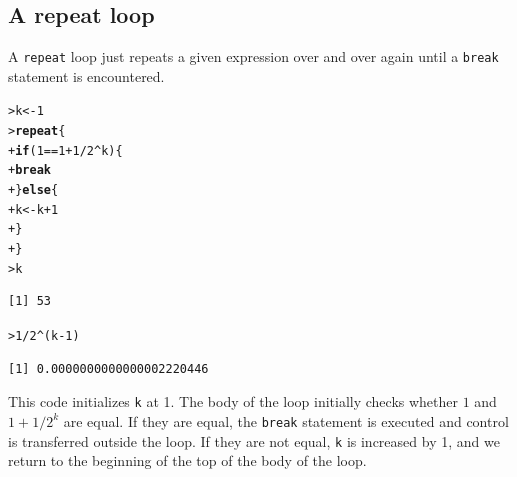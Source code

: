 \documentclass[12pt,oneside]{book}\usepackage[]{graphicx}\usepackage[]{color}
\makeatletter
\newcommand{\hlnum}[1]{\textcolor[rgb]{0.686,0.059,0.569}{#1}}%
\newcommand{\hlopt}[1]{\textcolor[rgb]{0,0,0}{#1}}%
\newcommand{\hlstd}[1]{\textcolor[rgb]{0.345,0.345,0.345}{#1}}%
\newcommand{\hlkwa}[1]{\textcolor[rgb]{0.161,0.373,0.58}{\textbf{#1}}}%
\newcommand{\hlkwb}[1]{\textcolor[rgb]{0.69,0.353,0.396}{#1}}%
\newenvironment{kframe}{%
 \def\at@end@of@kframe{}%
 \ifinner\ifhmode%
  \def\at@end@of@kframe{\end{minipage}}%
  \begin{minipage}{\columnwidth}%
 \fi\fi%
 \def\FrameCommand##1{\hskip\@totalleftmargin \hskip-\fboxsep
 \colorbox{shadecolor}{##1}\hskip-\fboxsep
     \hskip-\linewidth \hskip-\@totalleftmargin \hskip\columnwidth}%
 \MakeFramed {\advance\hsize-\width
   \@totalleftmargin\z@ \linewidth\hsize
   \@setminipage}}%
 {\par\unskip\endMakeFramed%
 \at@end@of@kframe}
\newenvironment{knitrout}{}{} %
\makeatother
\begin{document}
\subsection{A repeat loop}
A \verb+repeat+ loop just repeats a given expression over and over again until a \verb+break+ statement is encountered. 
\begin{knitrout}
\color{fgcolor}\begin{kframe}
\begin{alltt}
\hlstd{> }\hlstd{k} \hlkwb{<-} \hlnum{1}
\hlstd{> }\hlkwa{repeat} \hlstd{\{}
\hlstd{+ }    \hlkwa{if} \hlstd{(}\hlnum{1} \hlopt{==} \hlnum{1} \hlopt{+} \hlnum{1}\hlopt{/}\hlnum{2}\hlopt{^}\hlstd{k) \{}
\hlstd{+ }        \hlkwa{break}
\hlstd{+ }    \hlstd{\}} \hlkwa{else} \hlstd{\{}
\hlstd{+ }        \hlstd{k} \hlkwb{<-} \hlstd{k} \hlopt{+} \hlnum{1}
\hlstd{+ }    \hlstd{\}}
\hlstd{+ }\hlstd{\}}
\hlstd{> }\hlstd{k}
\end{alltt}
\begin{verbatim}
[1] 53
\end{verbatim}
\begin{alltt}
\hlstd{> }\hlnum{1}\hlopt{/}\hlnum{2}\hlopt{^}\hlstd{(k} \hlopt{-} \hlnum{1}\hlstd{)}
\end{alltt}
\begin{verbatim}
[1] 0.0000000000000002220446
\end{verbatim}
\end{kframe}
\end{knitrout}
This code initializes \verb+k+ at 1. The body of the loop initially checks whether $1$ and $1+1/2^k$ are equal. If they are equal, the \verb+break+ statement is executed and control is transferred outside the loop. If they are not equal, \verb+k+ is increased by 1, and we return to the beginning of the top of the body of the loop. 
\end{document}
